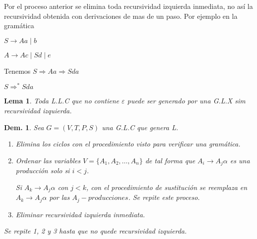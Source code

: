 \documentclass[12pt]{article}
\newtheorem{lema}{Lema}
\newtheorem{demostracion}{Dem. }
\begin{document}
Por el proceso anterior se elimina toda recursividad izquierda inmediata, no así la recursividad obtenida con derivaciones de mas de un paso. Por ejemplo en la gramática

\begin{center}
  $S \rightarrow Aa \mid b$

  $A \rightarrow Ac \mid Sd \mid e$
\end{center}

Tenemos $S \Rightarrow Aa \Rightarrow Sda$

\begin{center}
  $S \Rightarrow^* Sda$
\end{center}

\begin{lema}
  Toda L.L.C que no contiene $\varepsilon$ puede ser generado por una G.L.X sim recursividad izquierda.
\end{lema}

\begin{demostracion}
  Sea $G = (V, T, P, S)$ una G.L.C que genera L.

  \begin{enumerate}
    \item Elimina los ciclos con el procedimiento visto para verificar una gramática.
    \item Ordenar las variables $V = \{A_1, A_2, \dots, A_n \}$ de tal forma que $A_i \rightarrow A_j\alpha$ es una producción solo si $i < j$.
    
    Si $A_k \rightarrow A_j\alpha$ con $j < k$, con el procedimiento de sustitución se reemplaza en $A_k \rightarrow A_j\alpha$ por las $A_j-producciones$. Se repite este proceso.
    \item Eliminar recursividad izquierda inmediata.
  \end{enumerate}

  Se repite 1, 2 y 3 hasta que no quede recursividad izquierda.
\end{demostracion}
\end{document}
